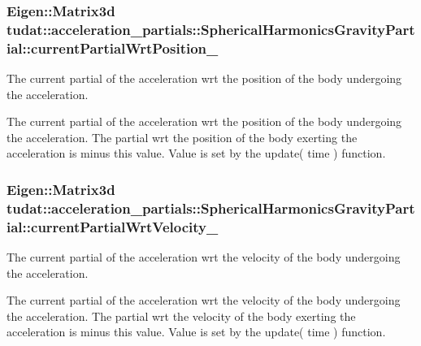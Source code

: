 \subsubsection[{\texorpdfstring{current\+Partial\+Wrt\+Position\+\_\+}{currentPartialWrtPosition_}}]{\setlength{\rightskip}{0pt plus 5cm}Eigen\+::\+Matrix3d tudat\+::acceleration\+\_\+partials\+::\+Spherical\+Harmonics\+Gravity\+Partial\+::current\+Partial\+Wrt\+Position\+\_\+\hspace{0.3cm}{\ttfamily [protected]}}\hypertarget{classtudat_1_1acceleration__partials_1_1SphericalHarmonicsGravityPartial_a41f5854f618449f734d9e385bb929778}{}\label{classtudat_1_1acceleration__partials_1_1SphericalHarmonicsGravityPartial_a41f5854f618449f734d9e385bb929778}


The current partial of the acceleration wrt the position of the body undergoing the acceleration. 

The current partial of the acceleration wrt the position of the body undergoing the acceleration. The partial wrt the position of the body exerting the acceleration is minus this value. Value is set by the update( time ) function. 
\subsubsection[{\texorpdfstring{current\+Partial\+Wrt\+Velocity\+\_\+}{currentPartialWrtVelocity_}}]{\setlength{\rightskip}{0pt plus 5cm}Eigen\+::\+Matrix3d tudat\+::acceleration\+\_\+partials\+::\+Spherical\+Harmonics\+Gravity\+Partial\+::current\+Partial\+Wrt\+Velocity\+\_\+\hspace{0.3cm}{\ttfamily [protected]}}\hypertarget{classtudat_1_1acceleration__partials_1_1SphericalHarmonicsGravityPartial_a350f32e79d02ae83d780222a504c2192}{}\label{classtudat_1_1acceleration__partials_1_1SphericalHarmonicsGravityPartial_a350f32e79d02ae83d780222a504c2192}


The current partial of the acceleration wrt the velocity of the body undergoing the acceleration. 

The current partial of the acceleration wrt the velocity of the body undergoing the acceleration. The partial wrt the velocity of the body exerting the acceleration is minus this value. Value is set by the update( time ) function. 
